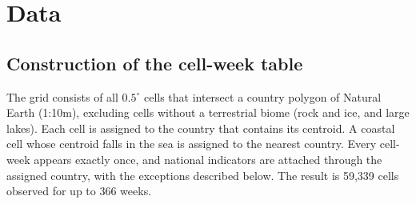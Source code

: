 \section{Data}\label{supp:data}

\subsection{Construction of the cell-week table}\label{supp:data-table}

The grid consists of all $0.5^\circ$ cells that intersect a country polygon of
Natural Earth (1:10m), excluding cells without a terrestrial biome (rock and ice, and
large lakes). Each cell is assigned to the country that contains its centroid. A
coastal cell whose centroid falls in the sea is assigned to the nearest country. Every
cell-week appears exactly once, and national indicators are attached through the
assigned country, with the exceptions described below. The result is 59{,}339 cells observed for up to 366 weeks.

